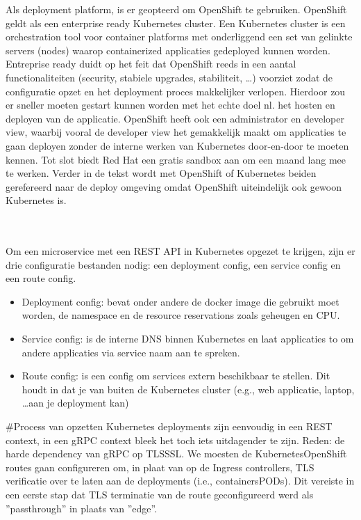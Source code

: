 Als deployment platform, is er geopteerd om OpenShift te gebruiken. OpenShift geldt als een enterprise ready Kubernetes cluster.
Een Kubernetes cluster is een orchestration tool voor container platforms met onderliggend een set van gelinkte servers (nodes)
waarop containerized applicaties gedeployed kunnen worden.
Entreprise ready duidt op het feit dat OpenShift reeds in een aantal functionaliteiten (security, stabiele upgrades, stabiliteit, \ldots)
voorziet zodat de configuratie opzet en het deployment proces makkelijker verlopen.
Hierdoor zou er sneller moeten gestart kunnen worden met het echte doel nl. het hosten en deployen van de applicatie.
OpenShift heeft ook een administrator en developer view, waarbij vooral de developer view het gemakkelijk maakt om applicaties te gaan deployen
zonder de interne werken van Kubernetes door-en-door te moeten kennen.
Tot slot biedt Red Hat een gratis sandbox aan om een maand lang mee te werken. Verder in de tekst wordt met OpenShift of Kubernetes beiden gerefereerd naar de deploy omgeving
omdat OpenShift uiteindelijk ook gewoon Kubernetes is.\newline
~\autocite{redhatwhatiskubernetes}\\
~\autocite{redhatopenshiftkubernetes}\\
~\autocite{redhatopenshift}

Om een microservice met een REST API in Kubernetes opgezet te krijgen, zijn er drie configuratie bestanden nodig: een deployment config,
een service config en een route config.~\parencite{openshiftDeployment}
\begin{itemize}
    \item Deployment config: bevat onder andere de docker image die gebruikt moet worden, de namespace en de resource reservations zoals geheugen en CPU.
    \item Service config: is de interne DNS binnen Kubernetes en laat applicaties to om andere applicaties via service naam aan te spreken.
    \item Route config: is een config om services extern beschikbaar te stellen. Dit houdt in dat je van buiten de Kubernetes cluster (e.g., web applicatie,
    laptop, \ldots aan je deployment kan)
\end{itemize}

\#Process van opzetten
Kubernetes deployments zijn eenvoudig in een REST context, in een gRPC context bleek het toch iets uitdagender te zijn. Reden: de harde
dependency van gRPC op TLS\/SSL. We moesten de Kubernetes\/OpenShift routes gaan configureren om, in plaat van op de Ingress controllers, TLS
verificatie over te laten aan de deployments (i.e., containers\/PODs). Dit vereiste in een eerste stap dat TLS terminatie van de route
geconfigureerd werd als ''passthrough'' in plaats van ''edge''.

